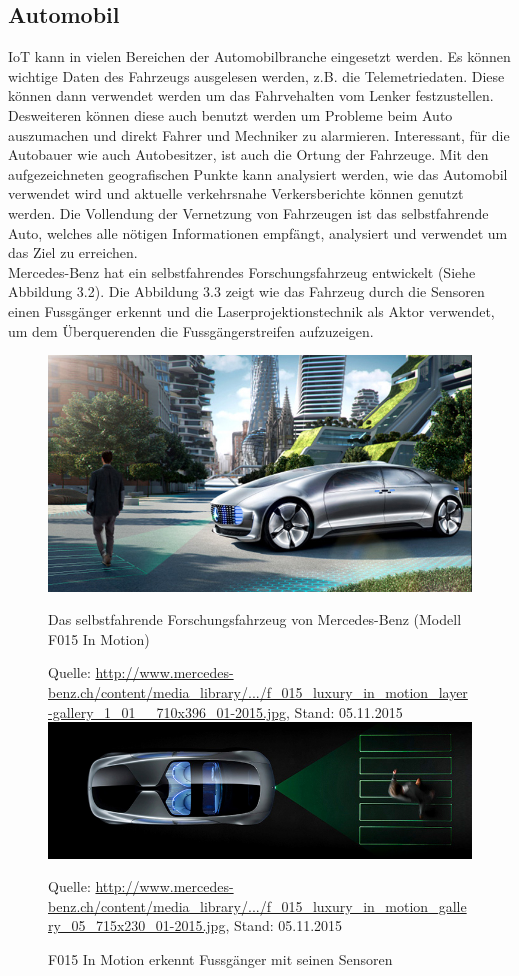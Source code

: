 \subsection{Automobil}
IoT kann in vielen Bereichen der Automobilbranche eingesetzt werden. Es können wichtige Daten des Fahrzeugs ausgelesen werden, z.B. die Telemetriedaten. Diese können dann verwendet werden um das Fahrvehalten vom Lenker festzustellen. Desweiteren können diese auch benutzt werden um Probleme beim Auto auszumachen und direkt Fahrer und Mechniker zu alarmieren.
Interessant, für die Autobauer wie auch Autobesitzer, ist auch die Ortung der Fahrzeuge. Mit den aufgezeichneten geografischen Punkte kann analysiert werden, wie das Automobil verwendet wird und aktuelle verkehrsnahe Verkersberichte können genutzt werden. Die Vollendung der Vernetzung von Fahrzeugen ist das selbstfahrende Auto, welches alle nötigen Informationen empfängt, analysiert und verwendet um das Ziel zu erreichen.\\
Mercedes-Benz hat ein selbstfahrendes Forschungsfahrzeug entwickelt (Siehe Abbildung 3.2). Die Abbildung 3.3 zeigt wie das Fahrzeug durch die Sensoren einen Fussgänger erkennt und die Laserprojektionstechnik als Aktor verwendet, um dem Überquerenden die Fussgängerstreifen aufzuzeigen.
\begin{figure}[h]
  \centering
  \includegraphics[scale=0.66]{98_Bilder/03_Marktsegmente/mercedesbenzf}
  \caption[Selbstfahrendes Auto Mercedes-Benz F015 In Motion]{Das selbstfahrende Forschungsfahrzeug von Mercedes-Benz (Modell F015 In Motion)}
  \footnotesize Quelle: \url{http://www.mercedes-benz.ch/content/media_library/.../f_015_luxury_in_motion_layer-gallery_1_01__710x396_01-2015.jpg}, Stand: 05.11.2015
  \centering
  \includegraphics[scale=0.66]{98_Bilder/03_Marktsegmente/mercedesbenzf2}
  \caption[Fussgängererkennung des F015]{F015 In Motion erkennt Fussgänger mit seinen Sensoren}
  \footnotesize Quelle: \url{http://www.mercedes-benz.ch/content/media_library/.../f_015_luxury_in_motion_gallery_05_715x230_01-2015.jpg}, Stand: 05.11.2015
\end{figure}
\newpage

